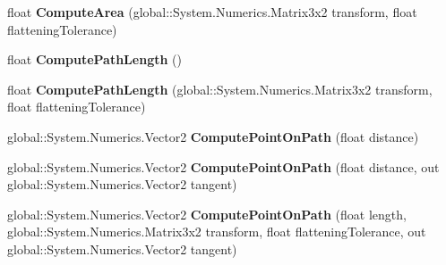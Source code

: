 \begin{DoxyCompactItemize}
\item 
\mbox{\label{class_microsoft_1_1_graphics_1_1_canvas_1_1_geometry_1_1_canvas_geometry_a691883046354446e27838e64d21e99bb}} 
float {\bfseries Compute\+Area} (global\+::\+System.\+Numerics.\+Matrix3x2 transform, float flattening\+Tolerance)
\item 
\mbox{\label{class_microsoft_1_1_graphics_1_1_canvas_1_1_geometry_1_1_canvas_geometry_ac795f5b565a905b8bfbd67e69c327ceb}} 
float {\bfseries Compute\+Path\+Length} ()
\item 
\mbox{\label{class_microsoft_1_1_graphics_1_1_canvas_1_1_geometry_1_1_canvas_geometry_a5ddd0bb4b6fa3da6b55d5cdbfdbea574}} 
float {\bfseries Compute\+Path\+Length} (global\+::\+System.\+Numerics.\+Matrix3x2 transform, float flattening\+Tolerance)
\item 
\mbox{\label{class_microsoft_1_1_graphics_1_1_canvas_1_1_geometry_1_1_canvas_geometry_a5bc13e03dbf00e5ca5deef3ddcc406c8}} 
global\+::\+System.\+Numerics.\+Vector2 {\bfseries Compute\+Point\+On\+Path} (float distance)
\item 
\mbox{\label{class_microsoft_1_1_graphics_1_1_canvas_1_1_geometry_1_1_canvas_geometry_a59cbc03d8d69b1b5eb3ac79a8e38ec04}} 
global\+::\+System.\+Numerics.\+Vector2 {\bfseries Compute\+Point\+On\+Path} (float distance, out global\+::\+System.\+Numerics.\+Vector2 tangent)
\item 
\mbox{\label{class_microsoft_1_1_graphics_1_1_canvas_1_1_geometry_1_1_canvas_geometry_a6bc7857a0a83e9f54a5231413995be25}} 
global\+::\+System.\+Numerics.\+Vector2 {\bfseries Compute\+Point\+On\+Path} (float length, global\+::\+System.\+Numerics.\+Matrix3x2 transform, float flattening\+Tolerance, out global\+::\+System.\+Numerics.\+Vector2 tangent)
\item 
\mbox{\label{class_microsoft_1_1_graphics_1_1_canvas_1_1_geometry_1_1_canvas_geometry_a33d42974c81157630960db493eedc046}} 

\end{DoxyCompactItemize}

